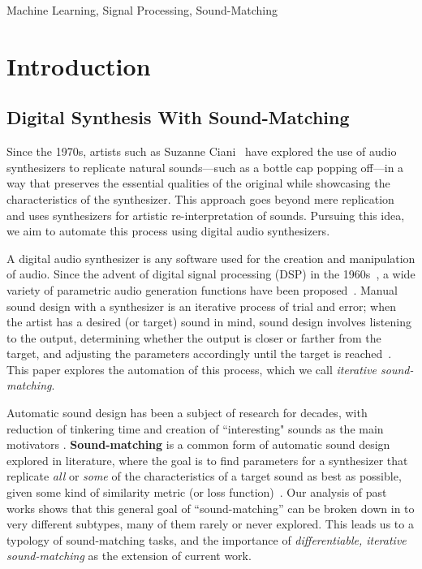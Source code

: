 \documentclass[lettersize,journal]{IEEEtran}
\providecommand{\gls}[1]{#1}
\begin{document}
\begin{IEEEkeywords}
Machine Learning, Signal Processing, Sound-Matching
\end{IEEEkeywords}

\section{Introduction}
\subsection{Digital Synthesis With Sound-Matching}
Since the 1970s, artists such as Suzanne Ciani~\cite{ciani_life_in_waves} have explored the use of audio synthesizers to replicate natural sounds—such as a bottle cap popping off—in a way that preserves the essential qualities of the original while showcasing the characteristics of the synthesizer. This approach goes beyond mere replication and uses synthesizers for artistic re-interpretation of sounds. Pursuing this idea, we aim to automate this process using digital audio synthesizers.

A digital audio synthesizer is any software used for the creation and manipulation of audio. Since the advent of digital signal processing (\gls{DSP}) in the 1960s~\cite{stranneby2004digital}, a wide variety of parametric audio generation functions have been proposed~\cite{lyons1997understanding,russ1999sound,shier2020spiegelib}. Manual sound design with a synthesizer is an iterative process of trial and error; when the artist has a desired (or target) sound in mind, sound design involves listening to the output, determining whether the output is closer or farther from the target, and adjusting the parameters accordingly until the target is reached~\cite{russ1999sound}. This paper explores the automation of this process, which we call \textit{iterative sound-matching}.

Automatic sound design has been a subject of research for decades, with reduction of tinkering time and creation of ``interesting" sounds as the main motivators \cite{krekovic2019insights,turian2020sorry,horner1993machine,salimi2020make,esling2019flow,engel2020ddsp,mitchell2007evolutionary,shier2020spiegelib}. \textbf{Sound-matching} is a common form of automatic sound design explored in literature, where the goal is to find parameters for a synthesizer that replicate \textit{all} or \textit{some} of the characteristics of a target sound as best as possible, given some kind of similarity metric (or loss function)~\cite{horner1993machine,mitchell2007evolutionary}. Our analysis of past works shows that this general goal of ``sound-matching'' can be broken down in to very different subtypes, many of them rarely or never explored. This leads us to a typology of sound-matching tasks, and the importance of \textit{differentiable, iterative sound-matching} as the extension of current work. 
\end{document}
